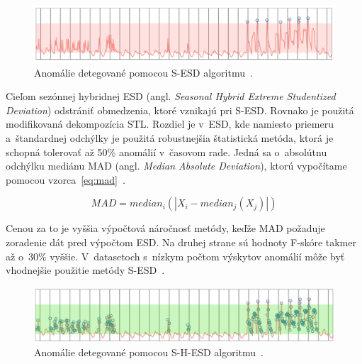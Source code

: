 \documentclass[a4paper,twoside,slovak,12pt,appendix]{article}
\begin{document}
\begin{figure}[htbp]
  \centering
  \includegraphics[width=\textwidth]{sesd_anomalies.png}
  \caption{Anomálie detegované pomocou S-ESD algoritmu~\cite{Hochenbaum2017}.}
  \label{fig:sesd-anomalies}
\end{figure}

Cieľom sezónnej hybridnej ESD (angl. \textit{Seasonal Hybrid Extreme
Studentized Deviation}) odstrániť obmedzenia, ktoré vznikajú pri S-ESD.
Rovnako je použitá modifikovaná dekompozícia STL. Rozdiel je v~ESD, kde
namiesto priemeru a~štandardnej odchýlky je použitá robustnejšia štatistická
metóda, ktorá je schopná tolerovať až 50\% anomálií v~časovom rade. Jedná sa
o~absolútnu odchýlku mediánu MAD (angl. \textit{Median Absolute Deviation}),
ktorú vypočítame pomocou vzorca~\ref{eq:mad}~\cite{Hochenbaum2017}.

\begin{equation}
	\label{eq:mad}
  MAD = median_i(|X_i - median_j(X_j)|)
\end{equation}

\noindent
Cenou za to je vyššia výpočtová náročnosť metódy, keďže MAD požaduje zoradenie
dát pred výpočtom ESD. Na druhej strane sú hodnoty F-skóre takmer až o~30\%
vyššie. V~datasetoch s~nízkym počtom výskytov anomálií môže byť vhodnejšie
použitie metódy S-ESD~\cite{Hochenbaum2017}.

\begin{figure}[htbp]
  \centering
  \includegraphics[width=\textwidth]{shesd_anomalies.png}
  \caption{Anomálie detegované pomocou S-H-ESD algoritmu~\cite{Hochenbaum2017}.}
  \label{fig:shesd-anomalies}
\end{figure}
\end{document}
